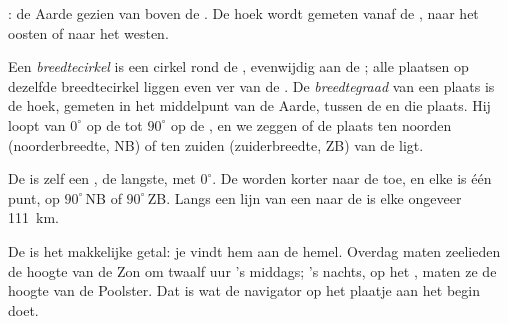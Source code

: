 \begin{omfigure}
\begin{minipage}[t]{0.48\linewidth}
{\small {}: de Aarde gezien van boven de . De hoek wordt
gemeten vanaf de , naar het oosten of naar het westen.}
\end{minipage}
\end{omfigure}

\begin{definition}\label{def:g6:latitude-longitude:latitude}
Een \emph{breedtecirkel} is een cirkel rond de ,
evenwijdig aan de ; alle plaatsen op dezelfde breedtecirkel liggen
even ver van de . De \emph{breedtegraad} van een
plaats is de hoek, gemeten in het middelpunt van de Aarde, tussen de
 en die plaats. Hij loopt van $0^\circ$ op de  tot $90^\circ$
op de , en we zeggen of de plaats ten noorden (noorderbreedte, NB) of
ten zuiden (zuiderbreedte, ZB) van de  ligt.
\end{definition}

De  is zelf een , de langste, met 
$0^\circ$. De  worden korter naar de  toe, en elke 
is één punt, op $90^\circ$\,NB of $90^\circ$\,ZB. Langs een lijn van een
 naar de  is elke  ongeveer \qty{111}{km}.

De  is het makkelijke getal: je vindt hem aan de hemel. Overdag
maten zeelieden de hoogte van de Zon om twaalf uur 's middags; 's nachts,
op het , maten ze de hoogte van de Poolster. Dat is wat
de navigator op het plaatje aan het begin doet.

